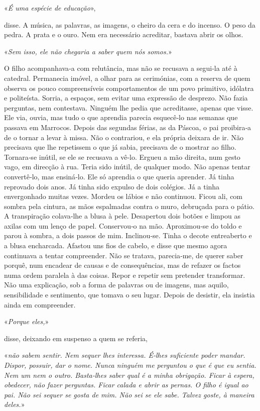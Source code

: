 «\emph{É uma espécie de educação}»,

disse. A música, as palavras, as imagens, o cheiro da cera e do incenso.
O peso da pedra. A prata e o ouro. Nem era necessário acreditar, bastava
abrir os olhos.

«\emph{Sem isso, ele não chegaria a saber quem nós somos.}»

O filho acompanhava­‑a com relutância, mas não se recusava a segui­‑la
até à catedral. Permanecia imóvel, a olhar para as cerimónias, com a
reserva de quem observa os pouco compreensíveis comportamentos de um
povo primitivo, idólatra e politeísta. Sorria, a espaços, sem evitar uma
expressão de desprezo. Não fazia perguntas, nem contestava. Ninguém lhe
pedia que acreditasse, apenas que visse. Ele via, ouvia, mas tudo o que
aprendia parecia esquecê­‑lo nas semanas que passava em Marrocos. Depois
das segundas férias, as da Páscoa, o pai proibira­‑a de o tornar a levar
à missa. Não o contrariou, e ela própria deixara de ir. Não precisava
que lhe repetissem o que já sabia, precisava de o mostrar ao filho.
Tornara­‑se inútil, se ele se recusava a vê­‑lo. Ergueu a mão direita,
num gesto vago, em direcção à rua. Teria sido inútil, de qualquer modo.
Não apenas tentar convertê­‑lo, mas ensiná­‑lo. Ele só aprendia o que
queria aprender. Já tinha reprovado dois anos. Já tinha sido expulso de
dois colégios. Já a tinha envergonhado muitas vezes. Mordeu os lábios e
não continuou. Ficou ali, com sombra pela cintura, as mãos espalmadas
contra o muro, debruçada para o pátio. A transpiração colava­‑lhe a
blusa à pele. Desapertou dois botões e limpou as axilas com um lenço de
papel. Conservou­‑o na mão. Aproximou­‑se do toldo e parou à sombra, a
dois passos de mim. Inclinou­‑se. Tinha o decote entreaberto e a blusa
encharcada. Afastou uns fios de cabelo, e disse que mesmo agora
continuava a tentar compreender. Não se tratava, parecia­‑me, de querer
saber porquê, num encadear de causas e de consequências, mas de refazer
os factos numa ordem paralela à das coisas. Repor e repetir sem
pretender transformar. Não uma explicação, sob a forma de palavras ou de
imagens, mas aquilo, sensibilidade e sentimento, que tomava o seu lugar.
Depois de desistir, ela insistia ainda em compreender.

«\emph{Porque eles,}»

disse, deixando em suspenso a quem se referia,

«\emph{não sabem sentir. Nem sequer lhes interessa. É­‑lhes suficiente
poder mandar. Dispor, possuir, dar o nome. Nunca ninguém me perguntou o
que é que eu sentia. Nem um nem o outro. Basta­‑lhes saber qual é a
minha obrigação. Ficar à espera, obedecer, não fazer perguntas. Ficar
calada e abrir as pernas. O filho é igual ao pai. Não sei sequer se
gosta de mim. Não sei se ele sabe. Talvez goste, à maneira deles.}»

